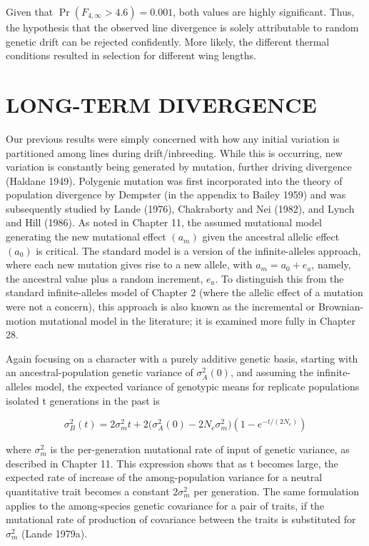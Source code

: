 \documentclass{article}
\begin{document}
Given that  $ \Pr(F_{4,\infty} > 4.6) = 0.001 $, both values are highly significant. Thus, the hypothesis that the observed line divergence is solely attributable to random genetic drift can be rejected confidently. More likely, the different thermal conditions resulted in selection for different wing lengths.

\section{LONG-TERM DIVERGENCE}
Our previous results were simply concerned with how any initial variation is partitioned among lines during drift/inbreeding. While this is occurring, new variation is constantly being generated by mutation, further driving divergence (Haldane 1949). Polygenic mutation was first incorporated into the theory of population divergence by Dempster (in the appendix to Bailey 1959) and was subsequently studied by Lande (1976), Chakraborty and Nei (1982), and Lynch and Hill (1986). As noted in Chapter 11, the assumed mutational model generating the new mutational effect  $ (a_m) $ given the ancestral allelic effect  $ (a_0) $ is critical. The standard model is a version of the infinite-alleles approach, where each new mutation gives rise to a new allele, with  $ a_m = a_0 + e_a $, namely, the ancestral value plus a random increment,  $ e_a $. To distinguish this from the standard infinite-alleles model of Chapter 2 (where the allelic effect of a mutation were not a concern), this approach is also known as the incremental or Brownian-motion mutational model in the literature; it is examined more fully in Chapter 28.

Again focusing on a character with a purely additive genetic basis, starting with an ancestral-population genetic variance of  $ \sigma_{A}^{2}(0) $, and assuming the infinite-alleles model, the expected variance of genotypic means for replicate populations isolated t generations in the past is

\begin{equation}
\sigma_{B}^{2}(t)=2\sigma_{m}^{2}t+2\big(\sigma_{A}^{2}(0)-2N_{e}\sigma_{m}^{2}\big)\left(1-e^{-t/(2N_{e})}\right)
\tag{12.10}
\label{eq:12_10}
\end{equation}

where  $ \sigma_{m}^{2} $ is the per-generation mutational rate of input of genetic variance, as described in Chapter 11. This expression shows that as t becomes large, the expected rate of increase of the among-population variance for a neutral quantitative trait becomes a constant  $ 2\sigma_{m}^{2} $ per generation. The same formulation applies to the among-species genetic covariance for a pair of traits, if the mutational rate of production of covariance between the traits is substituted for  $ \sigma_{m}^{2} $ (Lande 1979a).
\end{document}
